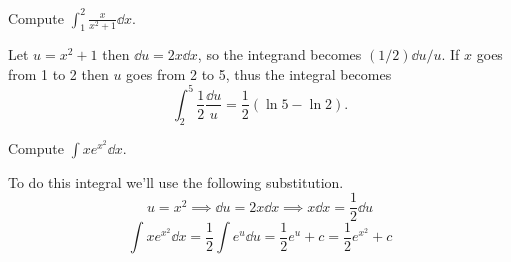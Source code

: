\begin{exercise}{}{}
Compute $\displaystyle\int_1^2\frac{x}{x^2+1}\dd{x}$.
\end{exercise}
\begin{solution}
Let $u=x^2+1$ then $\dd{u} = 2x\dd{x}$, so the integrand becomes $(1/2)\dd{u}/u$. If $x$ goes
from 1 to 2 then $u$ goes from 2 to 5, thus the integral becomes
\[ \int_2^5\frac{1}{2}\frac{\dd{u}}{u} = \frac{1}{2}(\ln5-\ln2). \]
\end{solution}

\begin{exercise}{}{}
Compute $\int xe^{x^2}\dd{x}$.
\end{exercise}
\begin{solution}
To do this integral we'll use the following substitution.
\[ u=x^2 \implies \dd{u}=2x\dd{x} \implies x\dd{x}=\frac{1}{2}\dd{u} \]
\[ \int x e^{x^2}\dd{x} = \frac{1}{2}\int e^u \dd{u} = \frac{1}{2}e^u + c = \frac{1}{2}e^{x^2} + c \]
\end{solution}

